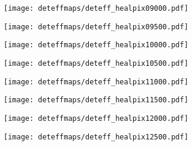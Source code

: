 \begin{figure}[H]
	\ContinuedFloat
	\centering
	\begin{subfigure}[t]{0.495\textwidth}
		\texttt{[image: deteffmaps/deteff\_healpix09000.pdf]}
		\subcaption{}
	\end{subfigure}
	\hfill
	\begin{subfigure}[t]{0.495\textwidth}
		\texttt{[image: deteffmaps/deteff\_healpix09500.pdf]}
		\subcaption{}
	\end{subfigure}
	\hfill
	\begin{subfigure}[t]{0.495\textwidth}
		\texttt{[image: deteffmaps/deteff\_healpix10000.pdf]}
		\subcaption{}
	\end{subfigure}
	\hfill
	\begin{subfigure}[t]{0.495\textwidth}
		\texttt{[image: deteffmaps/deteff\_healpix10500.pdf]}
		\subcaption{}
	\end{subfigure}
	\hfill
	\begin{subfigure}[t]{0.495\textwidth}
		\texttt{[image: deteffmaps/deteff\_healpix11000.pdf]}
		\subcaption{}
	\end{subfigure}
	\hfill
	\begin{subfigure}[t]{0.495\textwidth}
		\texttt{[image: deteffmaps/deteff\_healpix11500.pdf]}
		\subcaption{}
	\end{subfigure}
	\hfill
	\begin{subfigure}[t]{0.495\textwidth}
		\texttt{[image: deteffmaps/deteff\_healpix12000.pdf]}
		\subcaption{}
	\end{subfigure}
	\hfill
	\begin{subfigure}[t]{0.495\textwidth}
		\texttt{[image: deteffmaps/deteff\_healpix12500.pdf]}
		\subcaption{}
	\end{subfigure}
\end{figure}